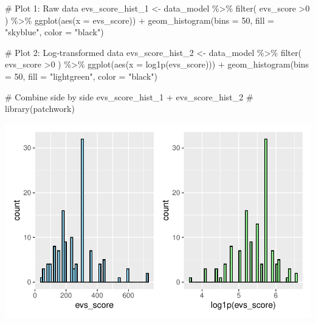 \documentclass[
  letterpaper,
  DIV=11,
  numbers=noendperiod]{scrartcl}
\newenvironment{Shaded}{\begin{snugshade}}{\end{snugshade}}
\newcommand{\AttributeTok}[1]{\textcolor[rgb]{0.40,0.45,0.13}{#1}}
\newcommand{\CommentTok}[1]{\textcolor[rgb]{0.37,0.37,0.37}{#1}}
\newcommand{\DecValTok}[1]{\textcolor[rgb]{0.68,0.00,0.00}{#1}}
\newcommand{\FunctionTok}[1]{\textcolor[rgb]{0.28,0.35,0.67}{#1}}
\newcommand{\NormalTok}[1]{\textcolor[rgb]{0.00,0.23,0.31}{#1}}
\newcommand{\OtherTok}[1]{\textcolor[rgb]{0.00,0.23,0.31}{#1}}
\newcommand{\SpecialCharTok}[1]{\textcolor[rgb]{0.37,0.37,0.37}{#1}}
\newcommand{\StringTok}[1]{\textcolor[rgb]{0.13,0.47,0.30}{#1}}
\begin{document}
\begin{Shaded}
\begin{Highlighting}[]
\CommentTok{\# Plot 1: Raw data}
\NormalTok{evs\_score\_hist\_1 }\OtherTok{\textless{}{-}}\NormalTok{ data\_model }\SpecialCharTok{\%\textgreater{}\%} 
    \FunctionTok{filter}\NormalTok{(}
\NormalTok{        evs\_score }\SpecialCharTok{\textgreater{}}\DecValTok{0}
\NormalTok{    ) }\SpecialCharTok{\%\textgreater{}\%} 
    \FunctionTok{ggplot}\NormalTok{(}\FunctionTok{aes}\NormalTok{(}\AttributeTok{x =}\NormalTok{ evs\_score)) }\SpecialCharTok{+} 
    \FunctionTok{geom\_histogram}\NormalTok{(}\AttributeTok{bins =} \DecValTok{50}\NormalTok{, }\AttributeTok{fill =} \StringTok{"skyblue"}\NormalTok{, }\AttributeTok{color =} \StringTok{"black"}\NormalTok{)}

\CommentTok{\# Plot 2: Log{-}transformed data}
\NormalTok{evs\_score\_hist\_2 }\OtherTok{\textless{}{-}}\NormalTok{ data\_model }\SpecialCharTok{\%\textgreater{}\%} 
     \FunctionTok{filter}\NormalTok{(}
\NormalTok{        evs\_score }\SpecialCharTok{\textgreater{}}\DecValTok{0}
\NormalTok{    ) }\SpecialCharTok{\%\textgreater{}\%} 
    \FunctionTok{ggplot}\NormalTok{(}\FunctionTok{aes}\NormalTok{(}\AttributeTok{x =} \FunctionTok{log1p}\NormalTok{(evs\_score))) }\SpecialCharTok{+} 
    \FunctionTok{geom\_histogram}\NormalTok{(}\AttributeTok{bins =} \DecValTok{50}\NormalTok{, }\AttributeTok{fill =} \StringTok{"lightgreen"}\NormalTok{, }\AttributeTok{color =} \StringTok{"black"}\NormalTok{)}

\CommentTok{\# Combine side by side}
\NormalTok{evs\_score\_hist\_1 }\SpecialCharTok{+}\NormalTok{ evs\_score\_hist\_2 }\CommentTok{\# library(patchwork)}
\end{Highlighting}
\end{Shaded}

\includegraphics{Outcomes_V1V2V3_files/figure-pdf/evs_score_1-1.pdf}
\end{document}
